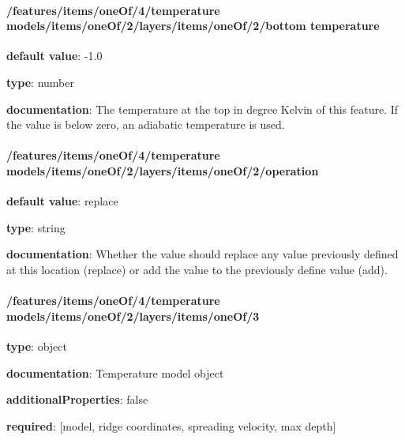 \begin{itemized}
\end{itemized}\paragraph{/features/items/oneOf/4/temperature models/items/oneOf/2/layers/items/oneOf/2/bottom temperature} \begin{itemized}
\item {\bf default value}: -1.0
\item {\bf type}: number
\item {\bf documentation}: The temperature at the top in degree Kelvin of this feature. If the value is below zero, an adiabatic temperature is used.
\end{itemized}\paragraph{/features/items/oneOf/4/temperature models/items/oneOf/2/layers/items/oneOf/2/operation} \begin{itemized}
\item {\bf default value}: replace
\item {\bf type}: string
\item {\bf documentation}: Whether the value should replace any value previously defined at this location (replace) or add the value to the previously define value (add).
\end{itemized}\paragraph{/features/items/oneOf/4/temperature models/items/oneOf/2/layers/items/oneOf/3} \begin{itemized}
\item {\bf type}: object
\item {\bf documentation}: Temperature model object
\item {\bf additionalProperties}: false
\item {\bf required}: [model, ridge coordinates, spreading velocity, max depth]\end{itemized}
